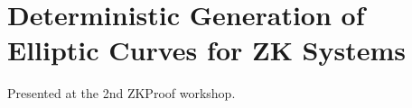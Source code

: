 \section{Deterministic Generation of Elliptic Curves for ZK Systems}

Presented at the 2nd ZKProof workshop.